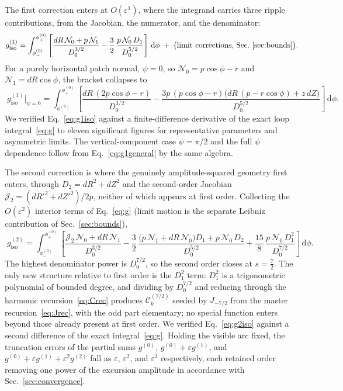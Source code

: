 \documentclass[11pt]{article}
\newcommand{\eps}{\varepsilon}
\newcommand{\dd}{\,\mathrm{d}}
\newcommand{\Ck}[2]{\mathcal{C}^{(#2)}_{#1}}
\newcommand{\Ja}[1]{J_{#1}}
\newcommand{\Order}[1]{O(\eps^{#1})}
\begin{document}
The first correction enters at $\Order{1}$, where the integrand carries three ripple contributions, from the Jacobian, the numerator, and the denominator:
\begin{equation}
g^{(1)}_{\mathrm{iso}}=\int_{\phi_-^{(0)}}^{\phi_+^{(0)}}
\left[\frac{dR\,\mathcal{N}_0+p\,\mathcal{N}_1}{D_0^{3/2}}
-\frac{3}{2}\,\frac{p\,\mathcal{N}_0\,D_1}{D_0^{5/2}}\right]\dd\phi
\;+\;\big(\text{limit corrections, Sec.~\ref{sec:bounds}}\big).
\label{eq:g1general}
\end{equation}
For a purely horizontal patch normal, $\psi=0$, so $\mathcal{N}_0=p\cos\phi-r$ and $\mathcal{N}_1=dR\cos\phi$, the bracket collapses to
\begin{equation}
\boxed{\;
g^{(1)}_{\mathrm{iso}}\big|_{\psi=0}=\int_{\phi_-^{(0)}}^{\phi_+^{(0)}}
\left[\frac{dR\,(2p\cos\phi-r)}{D_0^{3/2}}
-\frac{3p\,(p\cos\phi-r)\big(dR\,(p-r\cos\phi)+z\,dZ\big)}{D_0^{5/2}}\right]\dd\phi.\;}
\label{eq:g1iso}
\end{equation}
We verified Eq.~\eqref{eq:g1iso} against a finite-difference derivative of the exact loop integral~\eqref{eq:g} to eleven significant figures for representative parameters and asymmetric limits. The vertical-component case $\psi=\pi/2$ and the full $\psi$ dependence follow from Eq.~\eqref{eq:g1general} by the same algebra.

The second correction is where the genuinely amplitude-squared geometry first enters, through $D_2=dR^2+dZ^2$ and the second-order Jacobian $\mathcal{J}_2=(dR'^2+dZ'^2)/2p$, neither of which appears at first order. Collecting the $\Order{2}$ interior terms of Eq.~\eqref{eq:g} (limit motion is the separate Leibniz contribution of Sec.~\ref{sec:bounds}),
\begin{equation}
\boxed{\;
g^{(2)}_{\mathrm{iso}}=\int_{\phi_-^{(0)}}^{\phi_+^{(0)}}
\left[\frac{\mathcal{J}_2\,\mathcal{N}_0+dR\,\mathcal{N}_1}{D_0^{3/2}}
-\frac{3}{2}\,\frac{\big(p\,\mathcal{N}_1+dR\,\mathcal{N}_0\big)D_1+p\,\mathcal{N}_0\,D_2}{D_0^{5/2}}
+\frac{15}{8}\,\frac{p\,\mathcal{N}_0\,D_1^{2}}{D_0^{7/2}}\right]\dd\phi.\;}
\label{eq:g2iso}
\end{equation}
The highest denominator power is $D_0^{7/2}$, so the second order closes at $s=\tfrac72$. The only new structure relative to first order is the $D_1^2$ term: $D_1^2$ is a trigonometric polynomial of bounded degree, and dividing by $D_0^{7/2}$ and reducing through the harmonic recursion~\eqref{eq:Crec} produces $\Ck{k}{7/2}$ seeded by $\Ja{-7/2}$ from the master recursion~\eqref{eq:Jrec}, with the odd part elementary; no special function enters beyond those already present at first order. We verified Eq.~\eqref{eq:g2iso} against a second difference of the exact integral~\eqref{eq:g}. Holding the visible arc fixed, the truncation errors of the partial sums $g^{(0)}$, $g^{(0)}+\eps g^{(1)}$, and $g^{(0)}+\eps g^{(1)}+\eps^2 g^{(2)}$ fall as $\eps$, $\eps^2$, and $\eps^3$ respectively, each retained order removing one power of the excursion amplitude in accordance with Sec.~\ref{sec:convergence}.
\end{document}

